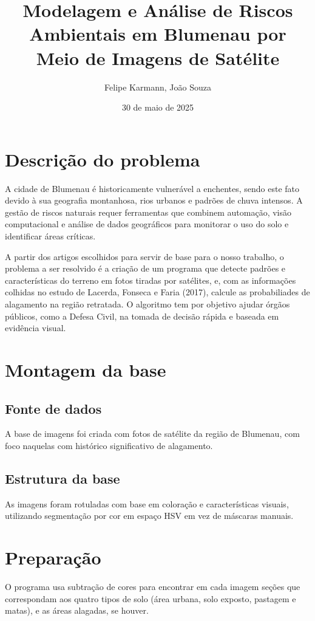 \documentclass{article}
\author{Felipe Karmann, João Souza}
\date{30 de maio de 2025}
\title{Modelagem e Análise de Riscos Ambientais em Blumenau por Meio de Imagens de Satélite}
\begin{document}
\maketitle

\section{Descrição do problema}

A cidade de Blumenau é historicamente vulnerável a enchentes, sendo este fato devido à sua geografia montanhosa, rios urbanos e padrões de chuva intensos. A gestão de riscos naturais requer ferramentas que combinem automação, visão computacional e análise de dados geográficos para monitorar o uso do solo e identificar áreas críticas.

A partir dos artigos escolhidos para servir de base para o nosso trabalho, o problema a ser resolvido é a criação de um programa que detecte padrões e características do terreno em fotos tiradas por satélites, e, com as informações colhidas no estudo de Lacerda, Fonseca e Faria (2017), calcule as probabiliades de alagamento na região retratada. O algoritmo tem por objetivo ajudar órgãos públicos, como a Defesa Civil, na tomada de decisão rápida e baseada em evidência visual.

\section{Montagem da base}
\subsection{Fonte de dados}

A base de imagens foi criada com fotos de satélite da região de Blumenau, com foco naquelas com histórico significativo de alagamento.

\subsection{Estrutura da base}

As imagens foram rotuladas com base em coloração e características visuais, utilizando segmentação por cor em espaço HSV em vez de máscaras manuais.

\section{Preparação}

O programa usa subtração de cores para encontrar em cada imagem seções que correspondam aos quatro tipos de solo (área urbana, solo exposto, pastagem e matas), e as áreas alagadas, se houver.
\end{document}
